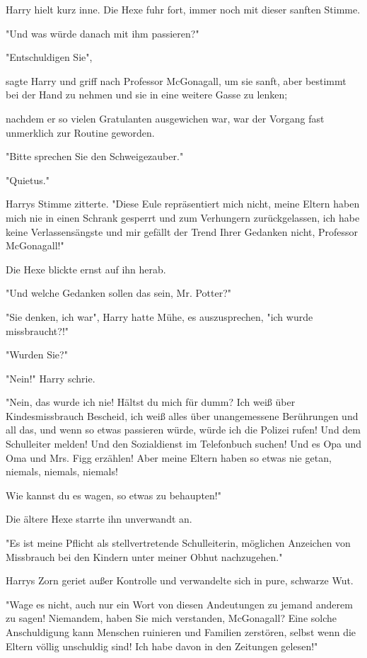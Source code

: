{Harry hielt kurz inne. Die Hexe fuhr fort, immer noch mit dieser sanften Stimme.

"Und was würde danach mit ihm passieren?"

"Entschuldigen Sie",

sagte Harry und griff nach Professor McGonagall, um sie sanft, aber bestimmt bei der Hand zu nehmen und sie in eine weitere Gasse zu lenken;

nachdem er so vielen Gratulanten ausgewichen war, war der Vorgang fast unmerklich zur Routine geworden.

"Bitte sprechen Sie den Schweigezauber."

"Quietus."

Harrys Stimme zitterte. "Diese Eule repräsentiert mich nicht, meine Eltern haben mich nie in einen Schrank gesperrt und zum Verhungern zurückgelassen, ich habe keine Verlassensängste und mir gefällt der Trend Ihrer Gedanken nicht, Professor McGonagall!"

Die Hexe blickte ernst auf ihn herab.

"Und welche Gedanken sollen das sein, Mr. Potter?"

"Sie denken, ich war", Harry hatte Mühe, es auszusprechen, "ich wurde missbraucht?!"

"Wurden Sie?"

"Nein!" Harry schrie.

"Nein, das wurde ich nie! Hältst du mich für dumm? Ich weiß über Kindesmissbrauch Bescheid, ich weiß alles über unangemessene Berührungen und all das, und wenn so etwas passieren würde, würde ich die Polizei rufen! Und dem Schulleiter melden! Und den Sozialdienst im Telefonbuch suchen! Und es Opa und Oma und Mrs. Figg erzählen! Aber meine Eltern haben so etwas nie getan, niemals, niemals, niemals!

Wie kannst du es wagen, so etwas zu behaupten!"

Die ältere Hexe starrte ihn unverwandt an.

"Es ist meine Pflicht als stellvertretende Schulleiterin, möglichen Anzeichen von Missbrauch bei den Kindern unter meiner Obhut nachzugehen."

Harrys Zorn geriet außer Kontrolle und verwandelte sich in pure, schwarze Wut.

"Wage es nicht, auch nur ein Wort von diesen Andeutungen zu jemand anderem zu sagen! Niemandem, haben Sie mich verstanden, McGonagall? Eine solche Anschuldigung kann Menschen ruinieren und Familien zerstören, selbst wenn die Eltern völlig unschuldig sind! Ich habe davon in den Zeitungen gelesen!"

}
